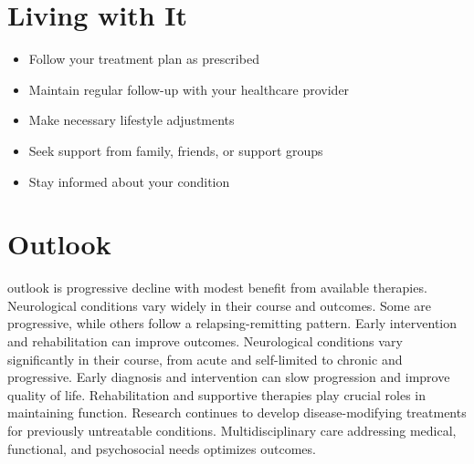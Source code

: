 \section{Living with It}
\begin{itemize}[noitemsep]
  \item Follow your treatment plan as prescribed
  \item Maintain regular follow-up with your healthcare provider
  \item Make necessary lifestyle adjustments
  \item Seek support from family, friends, or support groups
  \item Stay informed about your condition
\end{itemize}
\section{Outlook}
outlook is progressive decline with modest benefit from available therapies. Neurological conditions vary widely in their course and outcomes. Some are progressive, while others follow a relapsing-remitting pattern. Early intervention and rehabilitation can improve outcomes. Neurological conditions vary significantly in their course, from acute and self-limited to chronic and progressive. Early diagnosis and intervention can slow progression and improve quality of life. Rehabilitation and supportive therapies play crucial roles in maintaining function. Research continues to develop disease-modifying treatments for previously untreatable conditions. Multidisciplinary care addressing medical, functional, and psychosocial needs optimizes outcomes.
